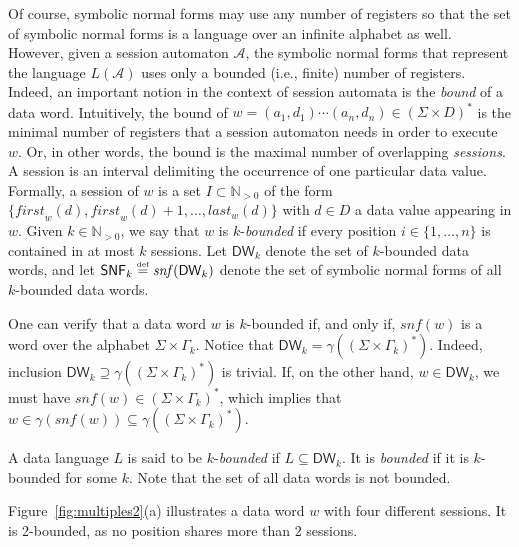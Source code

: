 \documentclass{LMCS}
\def\N{\ensuremath{\mathbb N}\xspace}
\def\Nz{\ensuremath{\N_{{}>0}}\xspace}
\newcommand\df{\ensuremath{\mathrel{\smash{\stackrel{\scriptscriptstyle{
    \text{def}}}{=}}}}}
\newcommand{\Data}{D}
\newcommand{\firstocc}[1]{\mathit{first}_{#1}}
\newcommand{\lastocc}[1]{\mathit{last}_{#1}}
\def\A{\mathcal A}
\def\concretization{\gamma}
\newcommand{\kNat}[1]{\Gamma_{#1}}
\newcommand{\snf}{\mathit{snf}}
\newcommand{\Bounded}[1]{\mathsf{DW}_{#1}}
\newcommand\NF{\mathsf{SNF}}
\def\figurename{Figure}
\begin{document}
Of course, symbolic normal forms may use any number of registers so
that the set of symbolic normal forms is a language over an infinite
alphabet as well. However, given a session automaton $\A$, the
symbolic normal forms that represent the language $L(\A)$ uses only a
bounded (i.e., finite) number of registers. Indeed, an important
notion in the context of session automata is the \emph{bound} of a
data word. Intuitively, the bound of $w = (a_1,d_1) \cdots (a_n,d_n)
\in (\Sigma \times \Data)^\ast$ is the minimal number of registers
that a session automaton needs in order to execute $w$. Or, in other
words, the bound is the maximal number of overlapping \emph{sessions}.
A session is an interval delimiting the occurrence of one particular
data value. Formally, a session of $w$ is a set $I \subset \Nz$ of the
form $\{\firstocc{w}(d),\firstocc{w}(d)+1,\ldots,\lastocc{w}(d)\}$
with $d \in \Data$ a data value appearing in $w$. Given $k
\in\Nz$, we say that $w$ is $k$-\emph{bounded} if every position $i
\in \{1,\ldots,n\}$ is contained in at most $k$ sessions.  Let
$\Bounded{k}$ denote the set of $k$-bounded data words, and let
$\NF_{k} \df \snf(\Bounded{k})$ denote the set of symbolic normal
forms of all $k$-bounded data words.

One can verify that a data word $w$ is $k$-bounded if, and only if,
$\snf(w)$ is a word over the alphabet $\Sigma \times \kNat{k}$. 
Notice that $\Bounded k = \concretization((\Sigma\times \kNat k)^\ast)$.
Indeed, inclusion $\Bounded k \supseteq \concretization((\Sigma\times
\kNat k)^\ast)$ is trivial. If, on the other hand, $w\in\Bounded k$, we must have
$\snf(w)\in (\Sigma\times \kNat k)^\ast$, which implies that
$w\in\concretization(\snf(w))\subseteq \concretization((\Sigma\times
\kNat k)^\ast)$.

A data language $L$ is said to be $k$-\emph{bounded} if $L \subseteq
\Bounded{k}$. It is \emph{bounded} if it is $k$-bounded for some $k$.
Note that the set of all data words is not bounded.

\figurename~\ref{fig:multiples2}(a) illustrates a
data word $w$ with four different sessions. It is 2-bounded, as no
position shares more than 2 sessions.
\end{document}
